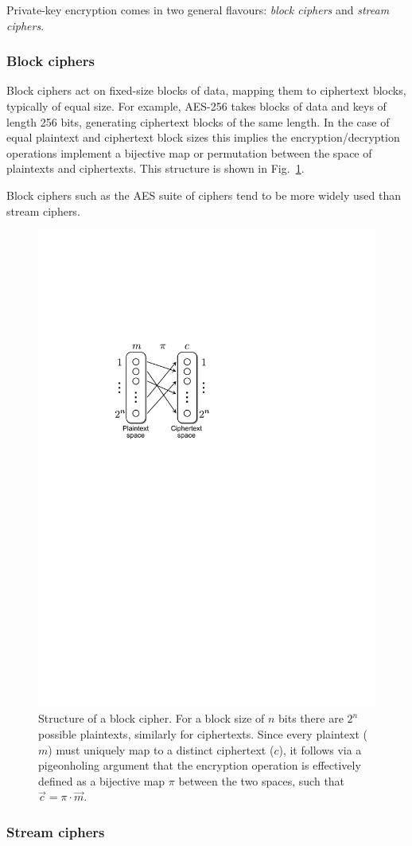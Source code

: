 Private-key encryption comes in two general flavours: \emph{block ciphers} and \emph{stream ciphers}. 

\subsubsection{Block ciphers}

Block ciphers act on fixed-size blocks of data, mapping them to ciphertext blocks, typically of equal size. For example, AES-256 takes blocks of data and keys of length 256 bits, generating ciphertext blocks of the same length. In the case of equal plaintext and ciphertext block sizes this implies the encryption/decryption operations implement a bijective map or permutation between the space of plaintexts and ciphertexts. This structure is shown in Fig.~\ref{fig:block_cipher}.

Block ciphers such as the AES suite of ciphers tend to be more widely used than stream ciphers.

\begin{figure}[!htb]
	\includegraphics[width=0.5\columnwidth]{figures/block_cipher}
	\caption{Structure of a block cipher. For a block size of $n$ bits there are $2^n$ possible plaintexts, similarly for ciphertexts. Since every plaintext ($m$) must uniquely map to a distinct ciphertext ($c$), it follows via a pigeonholing argument that the encryption operation is effectively defined as a bijective map $\pi$ between the two spaces, such that $\vec{c}=\pi\cdot \vec{m}$.} \label{fig:block_cipher}	
\end{figure}

\subsubsection{Stream ciphers}

